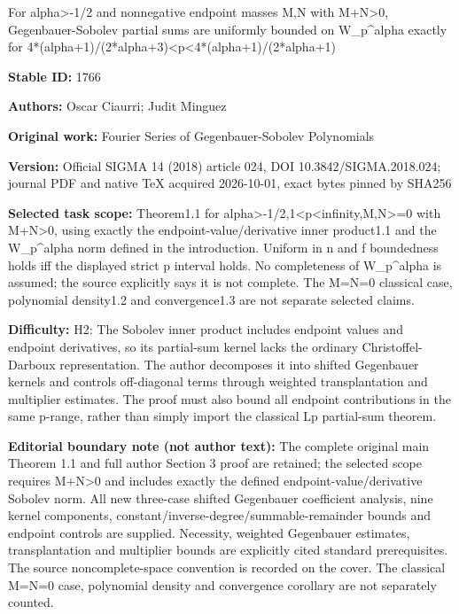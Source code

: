 \documentclass[11pt]{article}
\numberwithin{equation}{section}
\begin{document}
\begin{center}\Large For alpha>-1/2 and nonnegative endpoint masses M,N with M+N>0, Gegenbauer-Sobolev partial sums are uniformly bounded on W\_p\textasciicircum{}alpha exactly for 4*(alpha+1)/(2*alpha+3)<p<4*(alpha+1)/(2*alpha+1)\end{center}
\noindent\textbf{Stable ID:} 1766\par
\noindent\textbf{Authors:} Oscar Ciaurri; Judit Minguez\par
\noindent\textbf{Original work:} Fourier Series of Gegenbauer-Sobolev Polynomials\par
\noindent\textbf{Version:} Official SIGMA 14 (2018) article 024, DOI 10.3842/SIGMA.2018.024; journal PDF and native TeX acquired 2026-10-01, exact bytes pinned by SHA256\par
\noindent\textbf{Selected task scope:} Theorem1.1 for alpha>-1/2,1<p<infinity,M,N>=0 with M+N>0, using exactly the endpoint-value/derivative inner product1.1 and the W\_p\textasciicircum{}alpha norm defined in the introduction. Uniform in n and f boundedness holds iff the displayed strict p interval holds. No completeness of W\_p\textasciicircum{}alpha is assumed; the source explicitly says it is not complete. The M=N=0 classical case, polynomial density1.2 and convergence1.3 are not separate selected claims.\par
\noindent\textbf{Difficulty:} H2: The Sobolev inner product includes endpoint values and endpoint derivatives, so its partial-sum kernel lacks the ordinary Christoffel-Darboux representation. The author decomposes it into shifted Gegenbauer kernels and controls off-diagonal terms through weighted transplantation and multiplier estimates. The proof must also bound all endpoint contributions in the same p-range, rather than simply import the classical Lp partial-sum theorem.\par
\noindent\textbf{Editorial boundary note (not author text):} The complete original main Theorem 1.1 and full author Section 3 proof are retained; the selected scope requires M+N>0 and includes exactly the defined endpoint-value/derivative Sobolev norm. All new three-case shifted Gegenbauer coefficient analysis, nine kernel components, constant/inverse-degree/summable-remainder bounds and endpoint controls are supplied. Necessity, weighted Gegenbauer estimates, transplantation and multiplier bounds are explicitly cited standard prerequisites. The source noncomplete-space convention is recorded on the cover. The classical M=N=0 case, polynomial density and convergence corollary are not separately counted.\par
\end{document}

